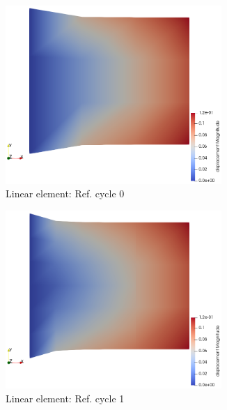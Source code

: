 \documentclass[11pt,a4paper,final]{article}
\begin{document}
\begin{figure}[h!]
\centering
\begin{subfigure}[b]{0.35\textwidth}
\centering
\includegraphics[width=0.9\textwidth]{patch_uniform_grid_ref_0.png}
\caption{Linear element: Ref. cycle 0}
\label{fig:1.3.1}
\end{subfigure}
\begin{subfigure}[b]{0.35\textwidth}
\centering
\includegraphics[width=0.9\textwidth]{patch_uniform_grid_ref_1.png}
\caption{Linear element: Ref. cycle 1}
\label{fig:1.3.2}
\end{subfigure}
\begin{subfigure}[b]{0.35\textwidth}
\centering

\end{subfigure}
\end{figure}
\end{document}

